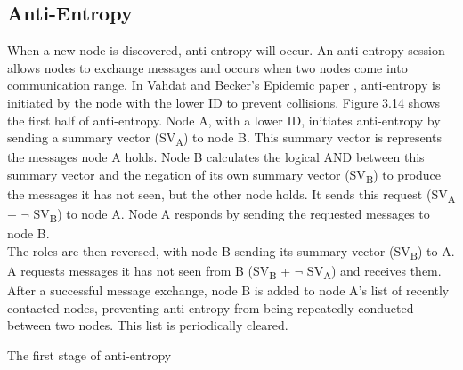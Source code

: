 \documentclass[12pt,a4paper]{report}
\makeatletter
\newenvironment{figurehere}
  {\def\@captype{figure}}
  {}
\makeatother
\begin{document}
\subsection{Anti-Entropy}
When a new node is discovered, anti-entropy will occur. An anti-entropy session allows nodes to exchange messages and occurs when two nodes come into communication range. In Vahdat and Becker's Epidemic paper \cite{epidemic}, anti-entropy is initiated by the node with the lower ID to prevent collisions. Figure 3.14 shows the first half of anti-entropy. Node A, with a lower ID, initiates anti-entropy by sending a summary vector (SV\textsubscript{A}) to node B. This summary vector is represents the messages node A holds. Node B calculates the logical AND between this summary vector and the negation of its own summary vector (SV\textsubscript{B}) to produce the messages it has not seen, but the other node holds. It sends this request (SV\textsubscript{A} + $\neg$ SV\textsubscript{B}) to node A. Node A responds by sending the requested messages to node B. \\
The roles are then reversed, with node B sending its summary vector (SV\textsubscript{B}) to A. A requests messages it has not seen from B (SV\textsubscript{B} + $\neg$ SV\textsubscript{A}) and receives them. \\
After a successful message exchange, node B is added to node A's list of recently contacted nodes, preventing anti-entropy from being repeatedly conducted between two nodes. This list is periodically cleared. \\
\begin{figurehere} 
\begin{center}
\end{center}
\caption{The first stage of anti-entropy \cite{epidemic}}
\end{figurehere} 
\bigskip
\end{document}
